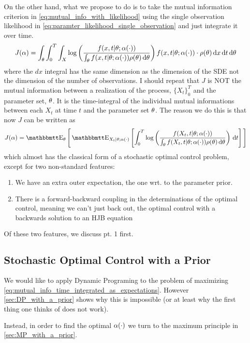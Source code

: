 \documentclass{article}
\begin{document}
On the other hand, what we propose to do is to take the mutual information
criterion in \cref{eq:mutual_info_with_likelihood} using the single observation
likelihood in \cref{eq:paramter_likelihood_single_observation} and just integrate it over time.
\begin{equation}
J({\alpha})  = \int_{\theta} \int_0^T\int_X
 \log\left(\frac{f(x,t|{\theta} ; {\alpha}(\cdot) )}
 			{\int_{\theta} f(x,t|{\theta}; {\alpha}(\cdot)) \rho({\theta})\, \mathrm{d} {\theta}}\right) 
 f(x,t|{\theta}; {\alpha}(\cdot)) \cdot \rho({\theta}) \, \mathrm{d} x\, \mathrm{d} t\, \mathrm{d} {\theta}
\label{eq:mutual_info_time_integrated}
\end{equation}
where the $dx$ integral has the same dimension as the dimension of the SDE
not the dimension of the number of observations. I should repeat that $J$ is NOT
the mutual information between a realization of the process, $\{ X_t\}_0^T$ and
the parameter set, ${\theta}$. It is the time-integral of the individual mutual
informations between each $X_t$ at time $t$ and the parameter set ${\theta}$. The
reason we do this is that now $J$ can be written as
\begin{equation}
J( \a) = \Exp_{\th} \Bigg[
\Exp_{X_t|\th; \a(\cdot)}
\left[ \int_0^T \log\left(\frac{f(X_t,t|\th; \a(\cdot))}
{\int_\th f(X_t,t|\th; \a(\cdot)) \rho(\th)\intd{\th}}\right) \intd{t} \right]
\Bigg] 
\label{eq:mutual_info_time_integrated_as_expectations}
\end{equation}
which almost has the classical form of a stochastic optimal control
problem, except for two non-standard features:
\begin{enumerate}
  \item We have an extra outer expectation, the one wrt. to the parameter
  prior.
\item There is a forward-backward coupling in the determinations of the optimal
control, meaning we can't just back out, the optimal control with a backwards
solution to an HJB equation
\end{enumerate}
Of these two features, we discuss pt. 1 first.

\subsection{Stochastic Optimal Control with a Prior}
We would like to apply Dynamic Programing to the problem of maximizing
\cref{eq:mutual_info_time_integrated_as_expectations}. However
\cref{sec:DP_with_a_prior} shows why this is impossible (or at least why the
first thing one thinks of does not work).

Instead, in order to find the optimal ${\alpha}(\cdot)$ we turn to the maximum
principle in \cref{sec:MP_with_a_prior}.
\end{document}

